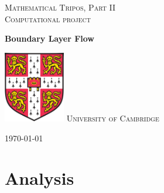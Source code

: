 \documentclass[a4paper,11pt]{article}
\begin{document}
\lstset{language = Matlab}
\begin{titlepage} %
	
	\center %
	
	\vspace*{3cm}

	\textsc{Mathematical Tripos, Part II}\\
	\textsc{Computational project}
	\begin{center}
      {\huge\bfseries Boundary Layer Flow\\[0.4cm]
}     \end{center}
	
	\vfill
	\vfill\vfill\vfill\vfill
	\includegraphics*[width = 2.675cm, height = 3.1cm]{coat.png}
	\vfill
    \textsc{University of Cambridge}
	
	\vspace*{\fill}
	\vfill
	{\large\today} 
	\vfill
	
\end{titlepage}
\setcounter{tocdepth}{3}
\tableofcontents

\newpage
\section{Analysis}
\end{document}
